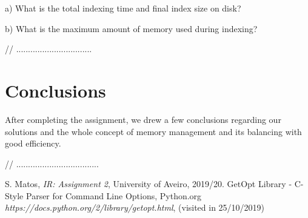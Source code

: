 \documentclass[12pt]{article}
\begin{document}
a) What is the total indexing time and final index size on disk?

b) What is the maximum amount of memory used during indexing?

// ................................

\newpage
\section*{Conclusions}

After completing the assignment, we drew a few conclusions regarding our
solutions and the whole concept of memory management and its balancing with
good efficiency.

// ...................................

\begin{thebibliography}{9}
  

    S. Matos,
    \textit{IR: Assignment 2},
    University of Aveiro,
    2019/20.
    GetOpt Library - C-Style Parser for Command Line Options,
    Python.org
    \textit{https://docs.python.org/2/library/getopt.html},
    (visited in 25/10/2019)
  
\end{thebibliography}

\clearpage
\end{document}
